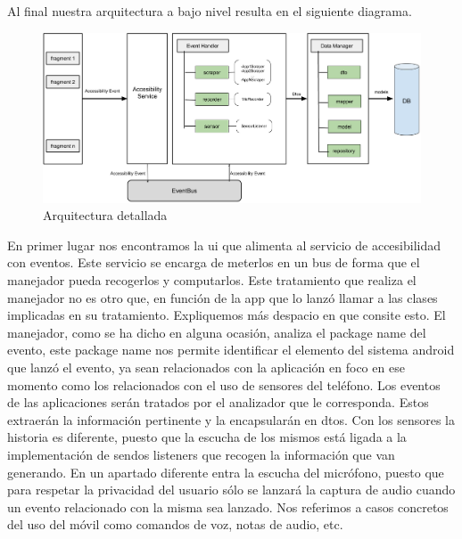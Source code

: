 \documentclass[12pt,a4paper,oneside]{book} %
\begin{document}
Al final nuestra arquitectura a bajo nivel resulta en el siguiente diagrama. 
\begin{figure}[H]
\begin{center}
		\includegraphics[width=1.3\textwidth]{pictures/architecture/arquitecturaGeneral03.png} 
	\caption[Arquitectura detallada]{Arquitectura detallada}
	\end{center}
\end{figure}
En primer lugar nos encontramos la ui que alimenta al servicio de accesibilidad con eventos. Este servicio se encarga de meterlos en un bus de forma que el manejador pueda recogerlos y computarlos. 
\newline \newline
Este tratamiento que realiza el manejador no es otro que, en función de la app que lo lanzó llamar a las clases implicadas en su tratamiento.
\newline \newline
Expliquemos más despacio en que consite esto. El manejador, como se ha dicho en alguna ocasión, analiza el package name del evento, este package name nos permite identificar el elemento del sistema android que lanzó el evento, ya sean relacionados con la aplicación en foco en ese momento como los relacionados con el uso de sensores del teléfono. 
\newline \newline
Los eventos de las aplicaciones serán tratados por el analizador que le corresponda. Estos extraerán la información pertinente y la encapsularán en dtos. 
\newline \newline
Con los sensores la historia es diferente, puesto que la escucha de los mismos está ligada a la implementación de sendos listeners que recogen la información que van generando. En un apartado diferente entra la escucha del micrófono, puesto que para respetar la privacidad del usuario sólo se lanzará la captura de audio cuando un evento relacionado con la misma sea lanzado. Nos referimos a casos concretos del uso del móvil como comandos de voz, notas de audio, etc. 
\end{document}
